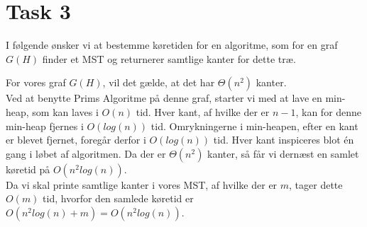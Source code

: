 \section{Task 3}
I følgende ønsker vi at bestemme køretiden for en algoritme, som for en graf $G(H)$ finder et MST og returnerer samtlige kanter for dette træ.
 
For vores graf $G(H)$, vil det gælde, at det har $\Theta(n^2)$ kanter.\\
Ved at benytte Prims Algoritme på denne graf, starter vi med at lave en min-heap, som kan laves i $O(n)$ tid. Hver kant, af hvilke der er $n-1$, kan for denne min-heap fjernes i $O(log(n))$ tid. Omrykningerne i min-heapen, efter en kant er blevet fjernet, foregår derfor i $O(log(n))$ tid.
Hver kant inspiceres blot én gang i løbet af algoritmen. Da der er $\Theta(n^2)$ kanter, så får vi dernæst en samlet køretid på $O(n^2log(n))$.\\
Da vi skal printe samtlige kanter i vores MST, af hvilke der er $m$, tager dette $O(m)$ tid, hvorfor den samlede køretid er $O(n^2log(n) + m) = O(n^2log(n))$.
